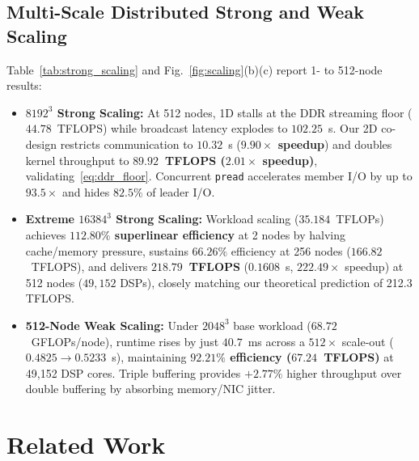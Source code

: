 \documentclass[conference]{IEEEtran}
\begin{document}
\subsection{Multi-Scale Distributed Strong and Weak Scaling}
Table~\ref{tab:strong_scaling} and Fig.~\ref{fig:scaling}(b)(c) report 1- to 512-node results:
\begin{itemize}\setlength{\itemsep}{0.5pt}\setlength{\parskip}{0pt}
    \item \textbf{$8192^3$ Strong Scaling:} At 512 nodes, 1D stalls at the DDR streaming floor ($44.78$~TFLOPS) while broadcast latency explodes to $102.25$~s. Our 2D co-design restricts communication to $10.32$~s (\textbf{$9.90\times$ speedup}) and doubles kernel throughput to \textbf{$89.92$~TFLOPS ($2.01\times$ speedup)}, validating~\eqref{eq:ddr_floor}. Concurrent \texttt{pread} accelerates member I/O by up to $93.5\times$ and hides $82.5\%$ of leader I/O.
    \item \textbf{Extreme $16384^3$ Strong Scaling:} Workload scaling ($35.184$~TFLOPs) achieves \textbf{$112.80\%$ superlinear efficiency} at 2 nodes by halving cache/memory pressure, sustains $66.26\%$ efficiency at 256 nodes ($166.82$~TFLOPS), and delivers \textbf{$218.79$~TFLOPS} ($0.1608$~s, $222.49\times$ speedup) at 512 nodes ($49{,}152$ DSPs), closely matching our theoretical prediction of 212.3 TFLOPS.
    \item \textbf{512-Node Weak Scaling:} Under $2048^3$ base workload ($68.72$~GFLOPs/node), runtime rises by just $40.7$~ms across a $512\times$ scale-out ($0.4825 \to 0.5233$~s), maintaining \textbf{$92.21\%$ efficiency ($67.24$~TFLOPS)} at 49,152 DSP cores. Triple buffering provides $+2.77\%$ higher throughput over double buffering by absorbing memory/NIC jitter.
\end{itemize}

\section{Related Work}
\label{sec:related}
\end{document}
